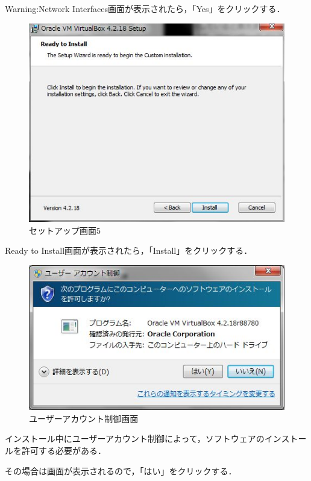 Warning:Network Interfaces画面が表示されたら，「Yes」をクリックする．

\begin{figure}[H]
\centering
\includegraphics[width=13cm]{Install.jpg}
\caption{セットアップ画面5}\label{サンプル図}
\end{figure}

Ready to Install画面が表示されたら，「Install」をクリックする．

\begin{figure}[H]
\centering
\includegraphics[width=13cm]{useracount.jpg}
\caption{ユーザーアカウント制御画面}\label{サンプル図}
\end{figure}

インストール中にユーザーアカウント制御によって，ソフトウェアのインストールを許可する必要がある．

その場合は画面が表示されるので，「はい」をクリックする．



